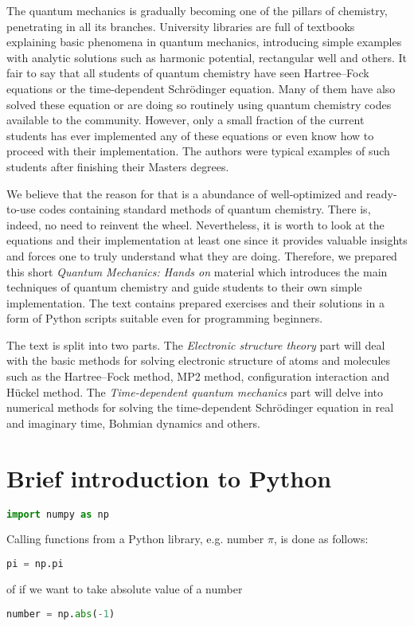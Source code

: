 The quantum mechanics is gradually becoming one of the pillars of chemistry, penetrating in all its branches. University libraries are full of textbooks explaining basic phenomena in quantum mechanics, introducing simple examples with analytic solutions such as harmonic potential, rectangular well and others. It fair to say that all students of quantum chemistry have seen Hartree--Fock equations or the time-dependent Schrödinger equation. Many of them have also solved these equation or are doing so routinely using quantum chemistry codes available to the community. However, only a small fraction of the current students has ever implemented any of these equations or even know how to proceed with their implementation. The authors were typical examples of such students after finishing their Masters degrees. 

We believe that the reason for that is a abundance of well-optimized and ready-to-use codes containing standard methods of quantum chemistry. There is, indeed, no need to reinvent the wheel. Nevertheless, it is worth to look at the equations and their implementation at least one since it provides valuable insights and forces one to truly understand what they are doing. Therefore, we prepared this short \textit{Quantum Mechanics: Hands on} material which introduces the main techniques of quantum chemistry and guide students to their own simple implementation. The text contains prepared exercises and their solutions in a form of Python scripts suitable even for programming beginners.

The text is split into two parts. The \textit{Electronic structure theory} part will deal with the basic methods for solving electronic structure of atoms and molecules such as the Hartree--Fock method, MP2 method, configuration interaction and Hückel method. The \textit{Time-dependent quantum mechanics} part will delve into numerical methods for solving the time-dependent Schrödinger equation in real and imaginary time, Bohmian dynamics and others. 


\section*{Brief introduction to Python}


\begin{lstlisting}[language=Python, style=mystyle2]
import numpy as np
\end{lstlisting}

Calling functions from a Python library, e.g. number $\pi$, is done as follows:
\begin{lstlisting}[language=Python, style=mystyle2]
pi = np.pi
\end{lstlisting}
of if we want to take absolute value of a number
\begin{lstlisting}[language=Python, style=mystyle2]
number = np.abs(-1)
\end{lstlisting}